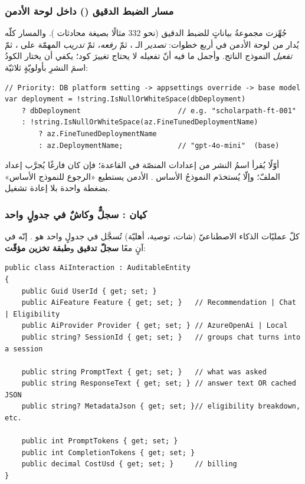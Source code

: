 \subsubsection{مسار الضبط الدقيق () داخل لوحة الأدمن}

جُهِّزت مجموعةُ بياناتٍ للضبط الدقيق (نحو 332 مثالًا بصيغة محادثات ).
والمسار كلّه يُدار من لوحة الأدمن في أربع خطوات: \emph{تصدير} الـ ، ثمّ
\emph{رفعه}، ثمّ \emph{تدريب} المهمّة على ، ثمّ \emph{تفعيل} النموذج
الناتج. وأجمل ما فيه أنّ تفعيله لا يحتاج تغييرَ كود؛ يكفي أن يختار الكودُ اسمَ
النشرِ بأولويّةٍ ثلاثيّة:

\begin{english}
\begin{lstlisting}[language={[Sharp]C}]
// Priority: DB platform setting -> appsettings override -> base model
var deployment = !string.IsNullOrWhiteSpace(dbDeployment)
    ? dbDeployment                       // e.g. "scholarpath-ft-001"
    : !string.IsNullOrWhiteSpace(az.FineTunedDeploymentName)
        ? az.FineTunedDeploymentName
        : az.DeploymentName;             // "gpt-4o-mini"  (base)
\end{lstlisting}
\end{english}

أوّلًا يُقرأ اسمُ النشر من إعدادات المنصّة في القاعدة؛ فإن كان فارغًا يُجرَّب إعداد
الملفّ؛ وإلّا يُستخدَم النموذجُ الأساس . الأدمن يستطيع «الرجوع للنموذج
الأساس» بضغطة واحدة بلا إعادة تشغيل.

\subsubsection{كيان : سجلٌّ وكاشٌ في جدولٍ واحد}

كلّ عمليّات الذكاء الاصطناعيّ (شات، توصية، أهليّة) تُسجَّل في جدولٍ واحد هو
. إنّه في آنٍ معًا \textbf{سجلّ تدقيق} و\textbf{طبقة تخزين مؤقّت}:

\begin{english}
\begin{lstlisting}[language={[Sharp]C}]
public class AiInteraction : AuditableEntity
{
    public Guid UserId { get; set; }
    public AiFeature Feature { get; set; }   // Recommendation | Chat | Eligibility
    public AiProvider Provider { get; set; } // AzureOpenAi | Local
    public string? SessionId { get; set; }   // groups chat turns into a session

    public string PromptText { get; set; }   // what was asked
    public string ResponseText { get; set; } // answer text OR cached JSON
    public string? MetadataJson { get; set; }// eligibility breakdown, etc.

    public int PromptTokens { get; set; }
    public int CompletionTokens { get; set; }
    public decimal CostUsd { get; set; }     // billing
}
\end{lstlisting}
\end{english}

